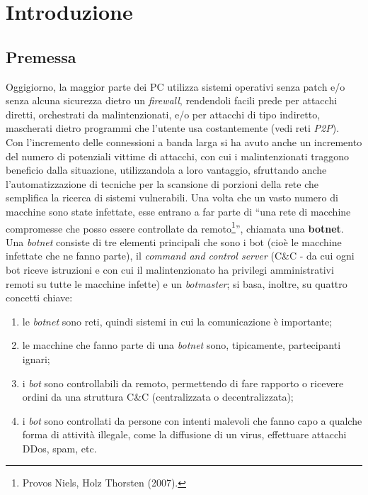 \chapter{Introduzione}
\section{Premessa}
Oggigiorno, la maggior parte dei PC utilizza sistemi operativi senza patch e/o senza alcuna sicurezza dietro un \textit{firewall}, rendendoli facili prede per attacchi diretti, orchestrati da malintenzionati, e/o per attacchi di tipo indiretto, mascherati dietro programmi che l'utente usa costantemente (vedi reti \textit{P2P}).\\
Con l'incremento delle connessioni a banda larga si ha avuto anche un incremento del numero di potenziali vittime di attacchi, con cui i malintenzionati traggono beneficio dalla situazione, utilizzandola a loro vantaggio, sfruttando anche l'automatizzazione di tecniche per la scansione di porzioni della rete che semplifica la ricerca di sistemi vulnerabili. Una volta che un vasto numero di macchine sono state infettate, esse entrano a far parte di ``una rete di macchine compromesse che posso essere controllate da remoto\footnote{Provos Niels, Holz Thorsten (2007).}'', chiamata una \textbf{botnet}.\\
Una \textit{botnet} consiste di tre elementi principali che sono i bot (cio\`e le macchine infettate che ne fanno parte), il \textit{command and control server} (C\&C - da cui ogni bot riceve istruzioni e con cui il malintenzionato ha privilegi amministrativi remoti su tutte le macchine infette) e un \textit{botmaster}; si basa, inoltre, su quattro concetti chiave:
\begin{enumerate}
\item le \textit{botnet} sono reti, quindi sistemi in cui la comunicazione \`e importante;
\item le macchine che fanno parte di una \textit{botnet} sono, tipicamente, partecipanti ignari;
\item i \textit{bot} sono controllabili da remoto, permettendo di fare rapporto o ricevere ordini da una struttura C\&C (centralizzata o decentralizzata);
\item i \textit{bot} sono controllati da persone con intenti malevoli che fanno capo a qualche forma di attivit\`{a} illegale, come la diffusione di un virus, effettuare attacchi DDos, spam, etc.
\end{enumerate}

